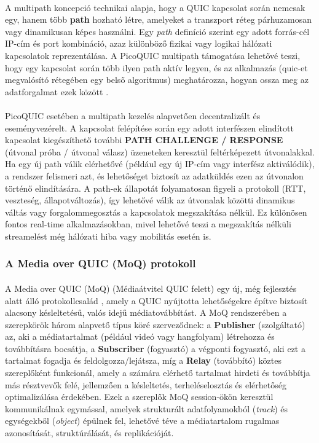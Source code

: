 \documentclass[a4paper,oneside]{article}
\begin{document}
\paragraph{}
A multipath koncepció technikai alapja, hogy a QUIC kapcsolat során nemcsak egy, 
hanem több \textbf{path}
hozható létre, amelyeket a transzport réteg párhuzamosan vagy dinamikusan képes használni. 
Egy \emph{path} definíció szerint egy adott forrás-cél IP-cím és port kombináció, azaz 
különböző fizikai vagy logikai hálózati kapcsolatok reprezentálása. A PicoQUIC multipath 
támogatása lehetővé teszi, hogy egy kapcsolat során több ilyen path aktív legyen, és az 
alkalmazás (quic-et megvalósító rétegében egy belső algoritmus) meghatározza, 
hogyan ossza meg az adatforgalmat ezek között \cite{pico_git}.
\paragraph{}
PicoQUIC esetében a multipath kezelés alapvetően decentralizált és eseményvezérelt. 
A kapcsolat felépítése során egy adott interfészen elindított kapcsolat kiegészíthető 
további \textbf{PATH CHALLENGE / RESPONSE} (útvonal próba / útvonal válasz) üzeneteken keresztül feltérképezett 
útvonalakkal. Ha egy új path válik elérhetővé (például egy új IP-cím vagy interfész 
aktiválódik), a rendszer felismeri azt, és lehetőséget biztosít az adatküldés ezen 
az útvonalon történő elindítására. A path-ek állapotát folyamatosan figyeli a protokoll 
(RTT, veszteség, állapotváltozás), így lehetővé válik az útvonalak közötti dinamikus 
váltás vagy forgalommegosztás a kapcsolatok megszakítása nélkül. Ez különösen 
fontos real-time alkalmazásokban, mivel lehetővé teszi a megszakítás nélküli streamelést 
még hálózati hiba vagy mobilitás esetén is.

\subsubsection{A Media over QUIC (MoQ) protokoll}
\paragraph{}

A Media over QUIC (MoQ) (Médiaátvitel QUIC felett) egy új, még fejlesztés alatt álló protokollcsalád \cite{moq_draft}, 
amely a QUIC nyújtotta lehetőségekre építve biztosít alacsony késleltetésű, 
valós idejű médiatovábbítást. A MoQ rendszerében a szerepkörök három alapvető 
típus köré szerveződnek: a \textbf{Publisher} (szolgáltató) az, aki a médiatartalmat (például 
videó vagy hangfolyam) létrehozza és továbbításra bocsátja, a \textbf{Subscriber} (fogyasztó)
a végponti fogyasztó, aki ezt a tartalmat fogadja és feldolgozza/lejátsza, míg a \textbf{Relay} (továbbító)
köztes szereplőként funkcionál, amely a számára elérhető tartalmat hirdeti és 
továbbítja más résztvevők felé, jellemzően a késleltetés, terheléselosztás 
és elérhetőség optimalizálása érdekében. 
Ezek a szereplők MoQ session-ökön keresztül kommunikálnak egymással, amelyek 
strukturált adatfolyamokból (\emph{track}) és egységekből (\emph{object}) épülnek 
fel, lehetővé téve a médiatartalom rugalmas azonosítását, struktúrálását, és replikációját.
\end{document}
